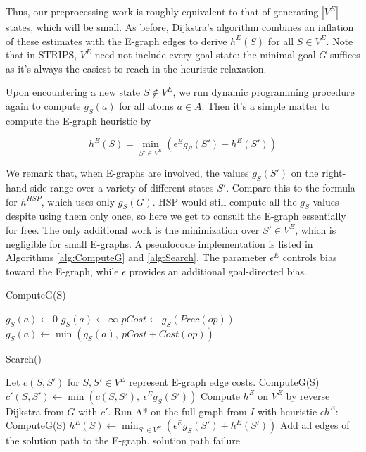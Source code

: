 \documentclass[letterpaper]{article}
\begin{document}
Thus, our preprocessing work is roughly equivalent to that of generating $|V^E|$ states, which will be small. As before, Dijkstra's algorithm combines an inflation of these estimates with the E-graph edges to derive $h^E(S)$ for all $S\in V^E$. Note that in STRIPS, $V^E$ need not include every goal state: the minimal goal $G$ suffices as it's always the easiest to reach in the heuristic relaxation.

Upon encountering a new state $S\notin V^E$, we run dynamic programming procedure again to compute $g_S(a)$ for all atoms $a\in A$. Then it's a simple matter to compute the E-graph heuristic by

\[h^E(S) = \min_{S'\in V^E} \left( \epsilon^E g_S(S') + h^E(S') \right)\]

We remark that, when E-graphs are involved, the values $g_S(S')$ on the right-hand side range over a variety of different states $S'$. Compare this to the formula for $h^{HSP}$, which uses only $g_S(G)$. HSP would still compute all the $g_S$-values despite using them only once, so here we get to consult the E-graph essentially for free. The only additional work is the minimization over $S'\in V^E$, which is negligible for small E-graphs. A pseudocode implementation is listed in Algorithms \ref{alg:ComputeG} and \ref{alg:Search}. The parameter $\epsilon^E$ controls bias toward the E-graph, while $\epsilon$ provides an additional goal-directed bias.

\begin{algorithm}
\caption{ComputeG(S)}
\label{alg:ComputeG}
\begin{algorithmic}
\STATE $g_S(a) \leftarrow 0$
\ELSE
\STATE $g_S(a) \leftarrow \infty$
\ENDIF
\ENDFOR
\REPEAT
{}
\STATE $pCost \leftarrow g_S(Prec(op))$
\STATE $g_S(a) \leftarrow \min \left(g_S(a),~pCost + Cost(op)\right)$
\ENDFOR
\ENDFOR
{}
\end{algorithmic}
\end{algorithm}

\begin{algorithm}
\caption{Search()}
\label{alg:Search}
\begin{algorithmic}
\STATE Let $c(S,S')$ for $S,S'\in V^E$ represent E-graph edge costs.
\STATE ComputeG(S)
\STATE $c'(S,S') \leftarrow \min\left(c(S,S'),~\epsilon^E g_S(S')\right)$
\ENDFOR
\ENDFOR
\STATE Compute $h^E$ on $V^E$ by reverse Dijkstra from $G$ with $c'$.
\STATE Run A* on the full graph from $I$ with heuristic $\epsilon h^E$:
\STATE ComputeG(S)
\STATE $h^E(S) \leftarrow \min_{S'\in V^E} \left( \epsilon^E g_S(S') + h^E(S') \right)$
\ENDFOR
{}
\STATE Add all edges of the solution path to the E-graph.
\RETURN solution path
\ELSE
\RETURN failure
\ENDIF
\end{algorithmic}
\end{algorithm}
\end{document}
